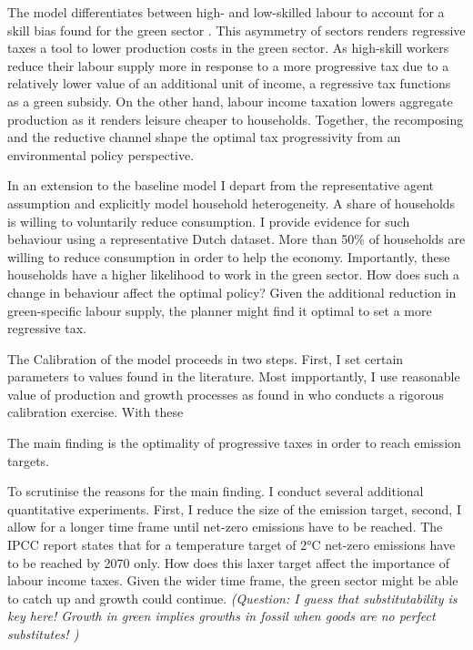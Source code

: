 The model differentiates between high- and low-skilled labour to account for a skill bias found for the green sector \citep{Consoli2016DoCapital}. This asymmetry of sectors renders regressive taxes a tool to lower production costs in the green sector. As high-skill workers reduce their labour supply more in response to a more progressive tax due to a relatively lower value of an additional unit of income, a regressive tax functions as a green subsidy. %
On the other hand, labour income taxation lowers aggregate production as it renders leisure cheaper to households. 
Together, the recomposing and the reductive channel shape the optimal tax progressivity from an environmental policy perspective. 

In an extension to the baseline model I depart from the representative agent assumption and explicitly model household heterogeneity. A share of households is willing to voluntarily reduce consumption. I provide evidence for such behaviour using a representative Dutch dataset. More than 50\% of households are willing to reduce consumption in order to help the economy. Importantly, these households have a higher likelihood to work in the green sector. How does such a change in behaviour affect the optimal policy? Given the additional reduction in green-specific labour supply, the planner might find it optimal to set a more regressive tax.    

The Calibration of the model proceeds in two steps. First, I set certain parameters to values found in the literature. Most impportantly, I use reasonable value of production and growth processes as found in \cite{Fried2018ClimateAnalysis} who conducts a rigorous calibration exercise.  With these 

The main finding is the optimality of progressive taxes in order to reach emission targets. 


To scrutinise the reasons for the main finding. I conduct several additional quantitative experiments. First, I reduce the size of the emission target, second, I allow for a longer time frame until net-zero emissions have to be reached. The IPCC report states that for a temperature target of 2°C net-zero emissions have to be reached by 2070 only. How does this laxer target affect the importance of labour income taxes. Given the wider time frame, the green sector might be able to catch up and growth could continue. \textit{(Question: I guess that substitutability is key here! Growth in green implies growths in fossil when goods are no perfect substitutes! )}